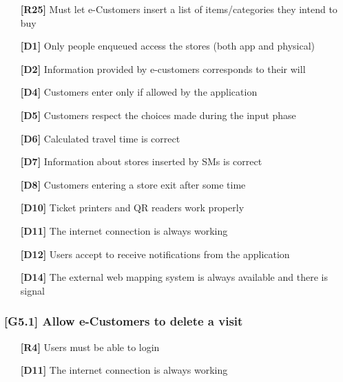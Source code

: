 \begin{itemize}
	\item [\textbf{[R25]}] Must let e-Customers insert a list of items/categories they intend to buy
	\\
	\item [\textbf{[D1]}] Only people enqueued access the stores (both app and physical)
	\item [\textbf{[D2]}] Information provided by e-customers corresponds to their will
	\item [\textbf{[D4]}] Customers enter only if allowed by the application
	\item [\textbf{[D5]}] Customers respect the choices made during the input phase
	\item [\textbf{[D6]}] Calculated travel time is correct
	\item [\textbf{[D7]}] Information about stores inserted by SMs is correct
	\item [\textbf{[D8]}] Customers entering a store exit after some time
	\item [\textbf{[D10]}] Ticket printers and QR readers work properly
	\item [\textbf{[D11]}] The internet connection is always working
	\item [\textbf{[D12]}] Users accept to receive notifications from the application
	\item [\textbf{[D14]}] The external web mapping system is always available and there is signal
\end{itemize}

\subsubsection{[G5.1] Allow e-Customers to delete a visit}
\begin{itemize}
	\setlength\itemsep{-1mm}
	\item [\textbf{[R4]}] Users must be able to login
	\\
	\item [\textbf{[D11]}] The internet connection is always working
\end{itemize}

